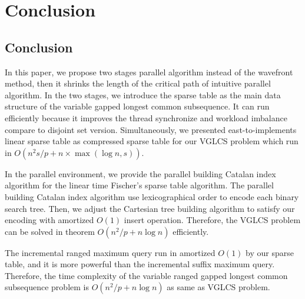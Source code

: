 \ifdefined\MasterThesis
\chapter{Conclusion}
\else
\section{Conclusion}
\fi
\label{sec:Conclusion}

In this paper, we propose two stages parallel algorithm instead of the
wavefront method, then it shrinks the length of the critical path of
intuitive parallel algorithm.  In the two stages, we introduce the
sparse table as the main data structure of the variable gapped longest
common subsequence.  It can run efficiently because it improves the
thread synchronize and workload imbalance compare to disjoint set
version.  Simultaneously, we presented east-to-implements linear sparse
table as compressed sparse table for our VGLCS problem which run in
$O(n^2 s / p + n \times \max(\log n, s))$.

In the parallel environment, we provide the parallel building Catalan
index algorithm for the linear time Fischer's sparse table algorithm.
The parallel building Catalan index algorithm use lexicographical order
to encode each binary search tree.  Then, we adjust the Cartesian tree
building algorithm to satisfy our encoding with amortized $O(1)$ insert
operation.  Therefore, the VGLCS problem can be solved in theorem $O(n^2
/ p + n \log n)$ efficiently.

The incremental ranged maximum query run in amortized $O(1)$ by our
sparse table, and it is more powerful than the incremental suffix
maximum query. Therefore, the time complexity of the variable ranged
gapped longest common subsequence problem is $O(n^2 / p + n \log n)$ as
same as VGLCS problem.
